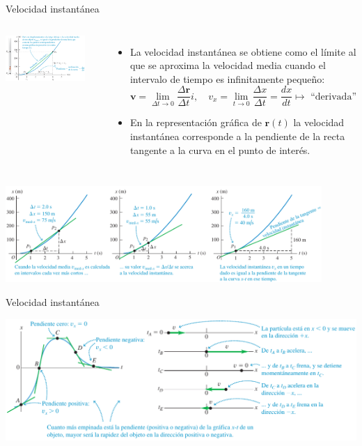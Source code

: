 \documentclass[9pt, aspectratio=169]{beamer}
\begin{document}
\begin{frame}{Velocidad instantánea}
\begin{columns}
\begin{center}
\includegraphics[width=0.85\textwidth]{figs/v_instantanea-1.png}
\end{center}
{\small
\begin{itemize}
    \item La velocidad instantánea se obtiene como el límite al que se aproxima la velocidad media cuando el intervalo de tiempo es infinitamente pequeño:
    \[ \bm{v} = \lim_{\Delta t \rightarrow 0} \frac{\Delta \bm{r}}{\Delta t}i, \quad v_x = \lim_{t \rightarrow 0} \frac{\Delta x}{\Delta t} = \frac{dx}{dt} \mapsto \text{ ``derivada''} \]
    \item En la representación gráfica de $\bm{r}(t)$ la velocidad instantánea corresponde a la pendiente de la recta tangente a la curva en el punto de interés.
\end{itemize}
}
\end{columns}
\begin{center}
\includegraphics[width=0.9\textwidth]{figs/v_instantanea.png}
\end{center}
\end{frame}

\begin{frame}{Velocidad instantánea}
    \begin{center}
        \includegraphics[width=1.0\textwidth]{figs/v_instantanea-2.png}
    \end{center}
\end{frame}
\end{document}
